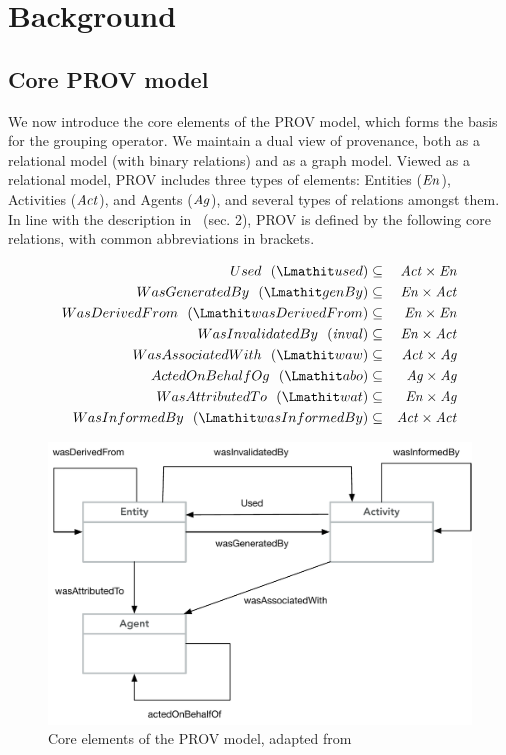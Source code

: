 
\section{Background}

\subsection{Core PROV model} \label{sec:prov-core}

We now introduce the core elements of the PROV model, which forms the basis for the grouping operator.
%
We maintain a dual view of provenance, both as a relational model (with binary relations) and as a graph model. Viewed as a relational model, PROV includes three types of elements: Entities ($\mathit{En}$), Activities ($\mathit{Act}$), and Agents ($\mathit{Ag}$), and several types of relations amongst them. 
In line with the description in~\citep{w3c-prov-dm} (sec. 2), PROV is defined by the following core relations, with common abbreviations in brackets. 

\begin{eqnarray*}
Used~~(\used)  & \subseteq & \act \times \en \\
WasGeneratedBy~~(\wgby) & \subseteq  & \en \times \act \\
WasDerivedFrom~~(\wdf) & \subseteq   & \en \times \en \\
WasInvalidatedBy~~(\inv) &  \subseteq &  \en \times \act \\
WasAssociatedWith~~(\waw) & \subseteq & \act \times \ag \\
ActedOnBehalfOg~~(\delegate) & \subseteq & \ag \times \ag \\ 
WasAttributedTo~~(\attrTo) & \subseteq & \en \times \ag \\
WasInformedBy~~(\wasInfBy) & \subseteq & \act \times \act
\end{eqnarray*}


\begin{figure}
\centering
\includegraphics[scale=.45]{figures/prov-essentials.pdf} 
\caption{Core elements of the PROV model, adapted from~\citep{w3c-prov-dm}}
\label{fig:prov-core}
\end{figure}

